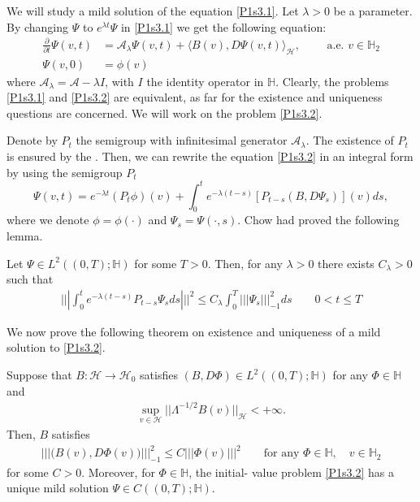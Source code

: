 \documentclass[review, onefignum, onetabnum]{siamart171218}
\begin{document}
We will study a mild solution of the equation \eqref{P1s3.1}. Let $\lambda>0$ 
be a parameter. By changing $\Psi$ to $e^{\lambda t}\Psi$ in 
\eqref{P1s3.1} we get the following equation: 
\begin{align*}
    \label{P1s3.2}
    \frac{\partial}{\partial t}\Psi(v,t)
        &= \mathcal{A}_\lambda\Psi(v,t)
        +
        \langle 
            B(v),D\Psi(v,t) 
        \rangle_\mathcal{H}, 
        \qquad \text{ a.e. } 
        v \in \mathbb{H}_2
    \\
    \Psi(v,0)
        &= \phi(v)
\end{align*}
where $\mathcal{A}_\lambda=\mathcal{A}-\lambda I$, with $I$ the identity 
operator in $\mathbb{H}$. Clearly, the problems \eqref{P1s3.1} and 
\eqref{P1s3.2} are equivalent, as far for the existence and uniqueness 
questions are concerned. We will work on the problem \eqref{P1s3.2}.

    Denote by $P_t$ the semigroup with infinitesimal generator 
$\mathcal{A}_\lambda$. The existence of $P_t$ is ensured by the 
. 
Then, we can rewrite the equation \eqref{P1s3.2} in an integral form by using 
the semigroup $P_t$
\begin{equation}
    \Psi(v,t)=
        e^{-\lambda t} (P_t\phi)(v)
        +
        \int_0^t  e^{-\lambda(t-s)}[P_{t-s}(B,D\Psi_s)](v) ds,
\end{equation}
where we denote $\phi=\phi(\cdot)$ and $\Psi_s=\Psi(\cdot,s)$. 
Chow \cite{liu} had proved the following lemma.

\begin{lemma}\label{Lemma.s3.1}
    Let $\Psi\in L^2((0,T);\mathbb{H})$ for some $T>0$. Then, for any 
    $\lambda>0$ there exists $C_\lambda>0$ such that 
     \begin{align}
        |||\int_0^t e^{-\lambda (t-s)} P_{t-s} \Psi_{s} ds |||^2 \le C_\lambda 
        \int_0^T |||\Psi_s|||_{-1}^2 ds\qquad 0< t\le T\label{s3.1.0}
     \end{align}
    
\end{lemma}

    We now prove the following theorem on existence and uniqueness of a mild 
    solution to \eqref{P1s3.2}.
\begin{theorem}
    \label{Th-EU}
    Suppose that $B:\mathcal{H}\rightarrow \mathcal{H}_0$ satisfies 
    $
        (B,D\Phi)\in 
        L^2((0,T);\mathbb{H})
    $ for any $\Phi\in\mathbb{H}$ and 
    \begin{align}
        \sup_{v\in \mathcal{H}} ||\Lambda^{-1/2}B(v)||_{\mathcal{H}}
            <+\infty.
    \end{align}
    Then, $B$ satisfies 
    \begin{align}
        ||| \big(B(v),D\Phi(v) \big) |||_{-1}^2 \le C |||\Phi(v) |||^2  \qquad 
        \mbox{for any } \Phi\in \mathbb{H}, 
        \quad v\in \mathbb{H}_2\label{s3.1.1}
    \end{align}
    for some $C>0$. 
    Moreover, for $\Phi\in \mathbb{H}$, the initial- value problem 
    \eqref{P1s3.2} has a unique mild solution 
    $\Psi\in C((0,T); \mathbb{H})$.
\end{theorem}
\end{document}
